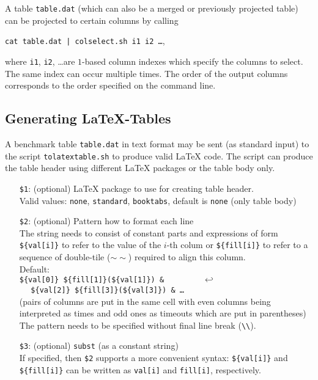 \documentclass[a4paper]{article}
\begin{document}
			A table {\tt table.dat} (which can also be a merged or previously projected table) can be projected
			to certain columns by calling
			\begin{center}
				{\tt cat table.dat | colselect.sh i1 i2 \ldots},
			\end{center}
			where {\tt i1}, {\tt i2}, \ldots are $1$-based column indexes
			which specify the columns to select. The same index can occur multiple times.
			The order of the output columns corresponds to the order specified on the command line.

		\subsection{Generating \LaTeX-Tables}

			A benchmark table {\tt table.dat} in text format
			may be sent (as standard input) to the script {\tt tolatextable.sh} to produce valid \LaTeX{} code.
			The script can produce the table header using different \LaTeX{} packages or the table body only.

			\medskip{}
			\begin{itemize}
				\item[{\tt \$1}:] (optional) \LaTeX{} package to use for creating table header. \\
					Valid values: {\tt none}, {\tt standard}, {\tt booktabs}, default is {\tt none} (only table body)
				\item[{\tt \$2}:] (optional) Pattern how to format each line \\
					The string needs to consist of constant parts and expressions of form
					{\tt \$\{val[i]\}} to refer to the value of the $i$-th colum
					or {\tt \$\{fill[i]\}} to refer to a sequence of double-tile ($\sim\sim$) required to align this column. \\
					Default: \\
					{\tt \$\{val[0]\} \$\{fill[1]\}(\$\{val[1]\}) \& $~~~~~~~~~~~~~~~~~~\hookleftarrow$ \\
					$~~~~~~$\$\{val[2]\} \$\{fill[3]\}(\$\{val[3]\}) \& \ldots} \\
					(pairs of columns are put in the same cell with even columns being interpreted as times
					and odd ones as timeouts which are put in parentheses) \\
					The pattern needs to be specified without final line break ({\tt \textbackslash\textbackslash}).
				\item[{\tt \$3}:] (optional) {\tt subst} (as a constant string) \\
					If specified, then {\tt \$2} supports a more convenient syntax: {\tt \$\{val[i]\}} and {\tt \$\{fill[i]\}} can be written as {\tt val[i]} and {\tt fill[i]}, respectively.
			\end{itemize}
\end{document}
